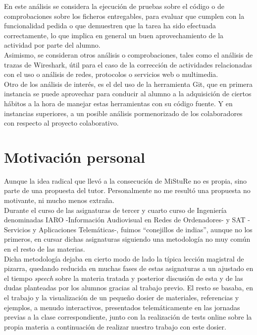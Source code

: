En este análisis se considera la ejecución de pruebas sobre el código o de comprobaciones sobre los ficheros entregables, para evaluar que cumplen con la funcionalidad pedida o que demuestren que la tarea ha sido efectuada correctamente, lo que implica en general un buen aprovechamiento de la actividad por parte del alumno.\\


Asimismo,  se consideran otros análisis o comprobaciones, tales como el análisis de trazas de Wireshark, útil para el caso de la corrección de actividades relacionadas con el uso o análisis de redes, protocolos o servicios web o multimedia.\\


Otro de los análisis de interés, es el del uso de la herramienta Git, que en primera instancia se puede aprovechar para conducir al alumno a la adquisición de ciertos hábitos a la hora de manejar estas herramientas con su código fuente. Y en instancias superiores, a un posible análisis pormenorizado de los colaboradores con respecto al proyecto colaborativo.\\


\section{Motivación personal}

Aunque la idea radical que llevó a la consecución de MiStuRe no es propia, sino parte de una propuesta del tutor. Personalmente no me resultó una propuesta no motivante, ni mucho menos extraña.\\


Durante el curso de las asignaturas de tercer y cuarto curso de Ingeniería denominadas IARO -Información Audiovisual en Redes de Ordenadores- y SAT -Servicios y Aplicaciones Telemáticas-, fuimos ``conejillos de indias'', aunque no los primeros, en cursar dichas asignaturas siguiendo una metodología no muy común en el resto de las materias.\\


Dicha metodología dejaba en cierto modo de lado la típica lección magistral de pizarra, quedando reducida en muchas fases de estas asignaturas a un ajustado en el tiempo \textit{speech} sobre la materia tratada y posterior discusión de esta y de las dudas planteadas por los alumnos gracias al trabajo previo. El resto se basaba, en el trabajo y la visualización de un pequeño dosier de materiales, referencias y ejemplos, a menudo interactivos, presentados telemáticamente en las jornadas previas a la clase correspondiente, junto con la realización de tests online sobre la propia materia a continuación de realizar nuestro trabajo con este dosier.\\


